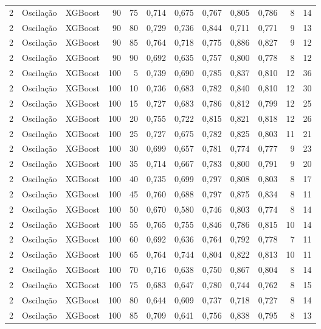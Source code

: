 \begin{longtable}{@{}rllrrrrrrrrr@{}}
2 & Oscilação & XGBoost & 90 & 75 & 0,714 & 0,675 & 0,767 & 0,805 & 0,786 & 8 & 14 \\
2 & Oscilação & XGBoost & 90 & 80 & 0,729 & 0,736 & 0,844 & 0,711 & 0,771 & 9 & 13 \\
2 & Oscilação & XGBoost & 90 & 85 & 0,764 & 0,718 & 0,775 & 0,886 & 0,827 & 9 & 12 \\
2 & Oscilação & XGBoost & 90 & 90 & 0,692 & 0,635 & 0,757 & 0,800 & 0,778 & 8 & 12 \\
2 & Oscilação & XGBoost & 100 & 5 & 0,739 & 0,690 & 0,785 & 0,837 & 0,810 & 12 & 36 \\
2 & Oscilação & XGBoost & 100 & 10 & 0,736 & 0,683 & 0,782 & 0,840 & 0,810 & 12 & 30 \\
2 & Oscilação & XGBoost & 100 & 15 & 0,727 & 0,683 & 0,786 & 0,812 & 0,799 & 12 & 25 \\
2 & Oscilação & XGBoost & 100 & 20 & 0,755 & 0,722 & 0,815 & 0,821 & 0,818 & 12 & 26 \\
2 & Oscilação & XGBoost & 100 & 25 & 0,727 & 0,675 & 0,782 & 0,825 & 0,803 & 11 & 21 \\
2 & Oscilação & XGBoost & 100 & 30 & 0,699 & 0,657 & 0,781 & 0,774 & 0,777 & 9 & 23 \\
2 & Oscilação & XGBoost & 100 & 35 & 0,714 & 0,667 & 0,783 & 0,800 & 0,791 & 9 & 20 \\
2 & Oscilação & XGBoost & 100 & 40 & 0,735 & 0,699 & 0,797 & 0,808 & 0,803 & 8 & 17 \\
2 & Oscilação & XGBoost & 100 & 45 & 0,760 & 0,688 & 0,797 & 0,875 & 0,834 & 8 & 11 \\
2 & Oscilação & XGBoost & 100 & 50 & 0,670 & 0,580 & 0,746 & 0,803 & 0,774 & 8 & 14 \\
2 & Oscilação & XGBoost & 100 & 55 & 0,765 & 0,755 & 0,846 & 0,786 & 0,815 & 10 & 14 \\
2 & Oscilação & XGBoost & 100 & 60 & 0,692 & 0,636 & 0,764 & 0,792 & 0,778 & 7 & 11 \\
2 & Oscilação & XGBoost & 100 & 65 & 0,764 & 0,744 & 0,804 & 0,822 & 0,813 & 10 & 11 \\
2 & Oscilação & XGBoost & 100 & 70 & 0,716 & 0,638 & 0,750 & 0,867 & 0,804 & 8 & 14 \\
2 & Oscilação & XGBoost & 100 & 75 & 0,683 & 0,647 & 0,780 & 0,744 & 0,762 & 8 & 15 \\
2 & Oscilação & XGBoost & 100 & 80 & 0,644 & 0,609 & 0,737 & 0,718 & 0,727 & 8 & 14 \\
2 & Oscilação & XGBoost & 100 & 85 & 0,709 & 0,641 & 0,756 & 0,838 & 0,795 & 8 & 13 \\

\end{longtable}
